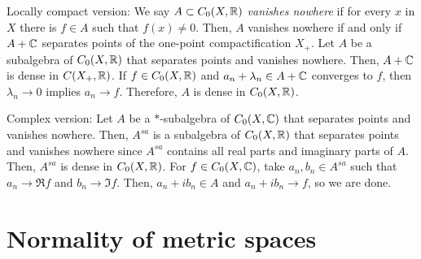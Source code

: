 \documentclass{../../large}
\begin{document}
Locally compact version:
We say $A\subset C_0(X,\mathbb{R})$ \emph{vanishes nowhere} if for every $x$ in $X$ there is $f\in A$ such that $f(x)\ne0$.
Then, $A$ vanishes nowhere if and only if $A+\mathbb{C}$ separates points of the one-point compactification $X_+$.
Let $A$ be a subalgebra of $C_0(X,\mathbb{R})$ that separates points and vanishes nowhere.
Then, $A+\mathbb{C}$ is dense in $C(X_+,\mathbb{R})$.
If $f\in C_0(X,\mathbb{R})$ and $a_n+\lambda_n\in A+\mathbb{C}$ converges to $f$, then $\lambda_n\to0$ implies $a_n\to f$.
Therefore, $A$ is dense in $C_0(X,\mathbb{R})$.




Complex version:
Let $A$ be a $*$-subalgebra of $C_0(X,\mathbb{C})$ that separates points and vanishes nowhere.
Then, $A^{sa}$ is a subalgebra of $C_0(X,\mathbb{R})$ that separates points and vanishes nowhere since $A^{sa}$ contains all real parts and imaginary parts of $A$.
Then, $A^{sa}$ is dense in $C_0(X,\mathbb{R})$.
For $f\in C_0(X,\mathbb{C})$, take $a_n,b_n\in A^{sa}$ such that $a_n\to\Re f$ and $b_n\to\Im f$.
Then, $a_n+ib_n\in A$ and $a_n+ib_n\to f$, so we are done.




\section{Normality of metric spaces}
\end{document}
